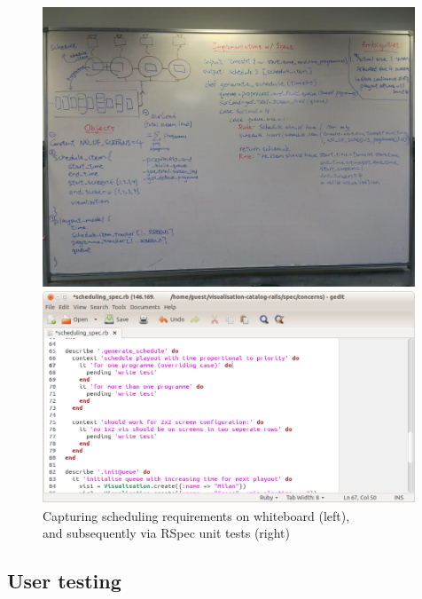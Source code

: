 \documentclass[a4paper]{article}
\begin{document}
\begin{figure}[H]
  \begin{minipage}{0.46\textwidth}
      \includegraphics[width = 0.99\textwidth, trim = 0 1cm 0 1.5cm, clip]{./evaluation/scheduling_whiteboard.jpg}
  \end{minipage}
  \begin{minipage}{0.53\textwidth}
      \includegraphics[width = 0.99\textwidth]{./evaluation/scheduling_spec.png}
  \end{minipage}
  \caption{Capturing scheduling requirements on whiteboard (left), \\ and subsequently via RSpec unit tests (right)}
 
\end{figure}

\subsection{User testing}
\end{document}
